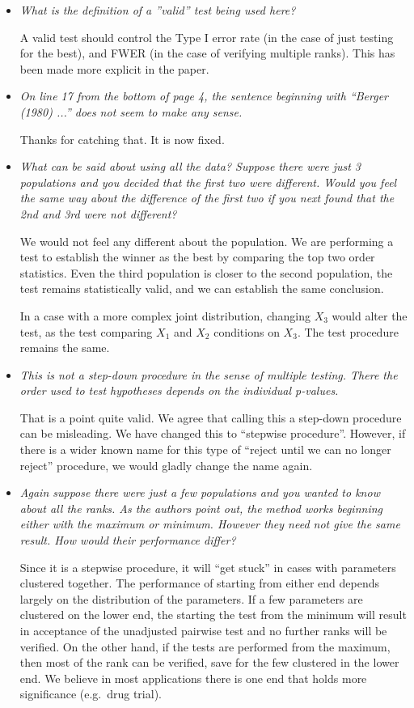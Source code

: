 \documentclass[]{article}
\theoremstyle{remark}
\begin{document}
\begin{itemize}
\item {\em What is the definition of a ”valid” test being used here?}

A valid test should control the Type I error rate (in the case of just testing for the best), and FWER (in the case of verifying multiple ranks). This has been made more explicit in the paper.

\item {\em On line 17 from the bottom of page 4, the sentence beginning with ``Berger (1980) ...'' does not seem to make any sense.}

Thanks for catching that. It is now fixed.

\item {\em What can be said about using all the data? Suppose there were just 3 populations and you decided that the first two were different. Would you feel the same way about the difference of the first two if you next found that the 2nd and 3rd were not different?}

We would not feel any different about the population. We are performing a test to establish the winner as the best by comparing the top two order statistics. Even the third population is closer to the second population, the test remains statistically valid, and we can establish the same conclusion.

In a case with a more complex joint distribution, changing $X_3$ would alter the test, as the test comparing $X_1$ and $X_2$ conditions on $X_3$. The test procedure remains the same.

\item {\em This is not a step-down procedure in the sense of multiple testing. There the order used to test hypotheses depends on the individual p-values.}

That is a point quite valid. We agree that calling this a step-down procedure can be misleading. We have changed this to ``stepwise procedure''. However, if there is a wider known name for this type of ``reject until we can no longer reject'' procedure, we would gladly change the name again.

\item {\em Again suppose there were just a few populations and you wanted to know about all the ranks. As the authors point out, the method works beginning either with the maximum or minimum. However they need not give the same result. How would their performance differ?}

Since it is a stepwise procedure, it will ``get stuck'' in cases with parameters clustered together. The performance of starting from either end depends largely on the distribution of the parameters. If a few parameters are clustered on the lower end, the starting the test from the minimum will result in acceptance of the unadjusted pairwise test and no further ranks will be verified. On the other hand, if the tests are performed from the maximum, then most of the rank can be verified, save for the few clustered in the lower end. We believe in most applications there is one end that holds more significance (e.g.\ drug trial).

\end{itemize}
\end{document}
